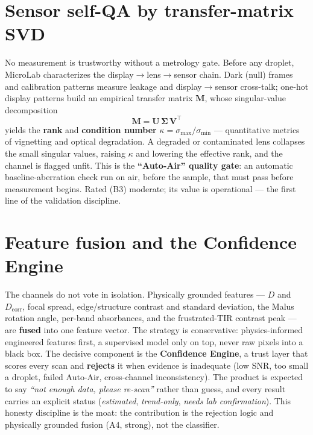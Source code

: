\documentclass[11pt]{article}
\begin{document}
\section{Sensor self-QA by transfer-matrix SVD}
No measurement is trustworthy without a metrology gate. Before any droplet, MicroLab
characterizes the display$\to$lens$\to$sensor chain. Dark (null) frames and calibration
patterns measure leakage and display$\to$sensor cross-talk; one-hot display patterns build an
empirical transfer matrix $\mathbf{M}$, whose singular-value decomposition
\begin{equation}
\mathbf{M} = \mathbf{U}\,\boldsymbol{\Sigma}\,\mathbf{V}^{\!\top}
\end{equation}
yields the \textbf{rank} and \textbf{condition number}
$\kappa=\sigma_\text{max}/\sigma_\text{min}$ --- quantitative metrics of vignetting and optical
degradation. A degraded or contaminated lens collapses the small singular values, raising
$\kappa$ and lowering the effective rank, and the channel is flagged unfit. This is the
\textbf{``Auto-Air'' quality gate}: an automatic baseline-aberration check run on air, before
the sample, that must pass before measurement begins. Rated (B3) moderate; its value is
operational --- the first line of the validation discipline.

\section{Feature fusion and the Confidence Engine}
The channels do not vote in isolation. Physically grounded features --- $D$ and $D_\text{corr}$,
focal spread, edge/structure contrast and standard deviation, the Malus rotation angle, per-band
absorbances, and the frustrated-TIR contrast peak --- are \textbf{fused} into one feature
vector. The strategy is conservative: physics-informed engineered features first, a supervised
model only on top, never raw pixels into a black box. The decisive component is the
\textbf{Confidence Engine}, a trust layer that scores every scan and \textbf{rejects} it when
evidence is inadequate (low SNR, too small a droplet, failed Auto-Air, cross-channel
inconsistency). The product is expected to say \emph{``not enough data, please re-scan''} rather
than guess, and every result carries an explicit status (\emph{estimated}, \emph{trend-only},
\emph{needs lab confirmation}). This honesty discipline is the moat: the contribution is the
rejection logic and physically grounded fusion (A4, strong), not the classifier.
\end{document}
